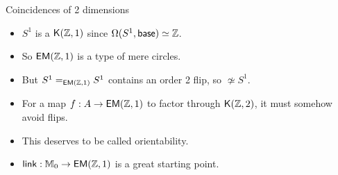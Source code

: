 \begin{frame}{Coincidences of 2 dimensions}
\begin{itemize}
\item \( S^1 \) is a \( \mathsf{K}(\mathbb{Z},1) \) since \( \Omega(S^1, \mathsf{base})\simeq \mathbb{Z} \).
\item So \( \mathsf{EM}(\mathbb{Z},1) \) is a type of \alert{mere circles}.
\item But \( S^1=_{\mathsf{EM}(\mathbb{Z},1)}S^1 \) contains an order 2 \alert{flip}, so \( \not\simeq S^1 \).
\item For a map \( f:A\to\mathsf{EM}(\mathbb{Z},1) \) to factor through  \( \mathsf{K}(\mathbb{Z},2) \), it must somehow avoid flips.
\item This deserves to be called \alert{orientability}.
\item \( \operatorname{\mathsf{link}}:\mathbb{M}_0\to\mathsf{EM}(\mathbb{Z},1) \) is a great starting point.
\end{itemize}
\end{frame}


